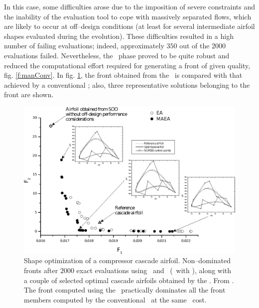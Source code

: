 \documentclass{vki_ls}
\begin{document}
In this case, some difficulties arose due to the imposition of severe constraints and the inability of the evaluation tool to cope with massively separated flows, which are likely to occur at off--design conditions (at least for several intermediate airfoil shapes evaluated during the evolution). 
These difficulties resulted in a high number of failing evaluations; indeed, approximately $350$ out of the $2000$ evaluations failed. 
Nevertheless, the \IPE\ phase proved to be quite robust and reduced the computational effort required for generating a front of given quality, fig. \ref{f:manConv}. 
In fig.  \ref{f:manFront}, the front obtained from the \MAEA\ is compared with that achieved by a conventional \EA; also, three representative solutions belonging to the front are shown.

\begin{figure}[!ht]
    \centering
    \includegraphics[]{maeas/manFront.eps}
    \caption{Shape optimization of a compressor cascade airfoil. Non--dominated
            fronts after $2000$ exact evaluations using \EA\ and \MAEA\
            (\EA\ with \IPE), along with a couple of selected optimal cascade 
   	    airfoils obtained by the \MAEA. From \cite{LTT_3_075}. The front 
	    computed using the \MAEA\ practically dominates all the front 
	    members computed by the conventional \EA\ at the same \CPU\ cost.}
            \label{f:manFront}
\end{figure}

%
%
\end{document}
